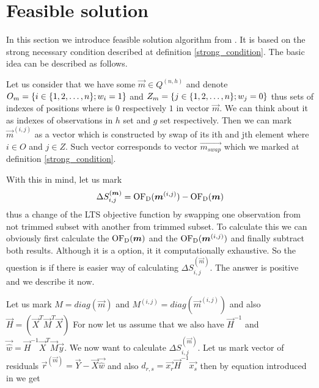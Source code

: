 

\section{Feasible solution} \label{section_feasible_solution}
In this section we introduce feasible solution algorithm from \cite{hawkins:1994}.
It is based on the strong necessary condition described at definition \ref{strong_condition}. 
The basic idea can be described as follows.

Let us consider that we have some $\vec{m} \in Q^{(n,h)}$ and denote $O_m = \{{i \in  \{{  1,2,\ldots , n  \}} ;w_i = 1\}}$ and $Z_m = \{{j \in  \{{  1,2,\ldots , n  \}} ;w_j = 0\}}$ thus sets of indexes of positions where is $0$ respectively $1$ in vector $\vec{m}$. We can think about it as indexes of observations in $h$ set and $g$ set respectively. Then we can mark $\vec{m}^{(i,j)}$ as a vector which is constructed by swap of its ith and jth element where $i \in O$ and $j \in Z$. Such vector corresponds to vector $\vec{m_{swap}}$ which we marked at definition \ref{strong_condition}.

With this in mind, let us mark 
\begin{equation}
    \Delta S^{(\boldsymbol{m})}_{i,j} = \operatorname{OF_D}(\boldsymbol{m}^{(i,j)}) - \operatorname{OF_D}(\boldsymbol{m})
\end{equation}
thus a change of the LTS objective function by swapping one observation from not trimmed subset with another from trimmed subset. To calculate this we can obviously first calculate the  $\operatorname{OF_D}(\boldsymbol{m})$ and  the $ \operatorname{OF_D}(\boldsymbol{m}^{(i,j)})$ and finally subtract both results. Although it is a option, it it computationally exhaustive. So the question is if there is easier way of calculating $\Delta S^{(\vec{m})}_{i,j}$. The answer is positive and we describe it now.

Let us mark  
$M = diag(\vec{m})$ and 
$M^{(i,j)} = diag(\vec{m}^{(i,j)})$ and also
$\vec{H} = (\vec{X}^T\vec{M}^T\vec{X})$
For now let us assume that we also have
$\vec{H}^{-1}$ and $\vec{\hat{w}} = \vec{H}^{-1}\vec{X}^T\vec{M}\vec{y}$.
We now want to calculate $\Delta S^{(\vec{m})}_{i,j}$.
Let us mark vector of residuals 
$\vec{r}^{(\vec{m})} = \vec{Y} - \vec{X} \vec{\hat{w}} $
and also $d_{r,s} = \vec{x_r} \vec{H}^{-1}  \vec{x_s} $
then by equation introduced in \cite{atkinson1991simulated} we get

